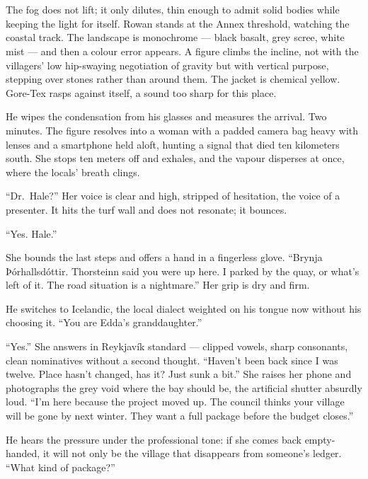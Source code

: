 \documentclass[11pt,oneside]{book}
\begin{document}
\chapter{}

The fog does not lift; it only dilutes, thin enough to admit solid
bodies while keeping the light for itself. Rowan stands at the Annex
threshold, watching the coastal track. The landscape is monochrome ---
black basalt, grey scree, white mist --- and then a colour error
appears. A figure climbs the incline, not with the villagers' low
hip-swaying negotiation of gravity but with vertical purpose, stepping
over stones rather than around them. The jacket is chemical yellow.
Gore-Tex rasps against itself, a sound too sharp for this place.

He wipes the condensation from his glasses and measures the arrival. Two
minutes. The figure resolves into a woman with a padded camera bag heavy
with lenses and a smartphone held aloft, hunting a signal that died ten
kilometers south. She stops ten meters off and exhales, and the vapour
disperses at once, where the locals' breath clings.

``Dr.~Hale?'' Her voice is clear and high, stripped of hesitation, the
voice of a presenter. It hits the turf wall and does not resonate; it
bounces.

``Yes. Hale.''

She bounds the last steps and offers a hand in a fingerless glove.
``Brynja Þórhallsdóttir. Thorsteinn said you were up here. I parked by
the quay, or what's left of it. The road situation is a nightmare.'' Her
grip is dry and firm.

He switches to Icelandic, the local dialect weighted on his tongue now
without his choosing it. ``You are Edda's granddaughter.''

``Yes.'' She answers in Reykjavík standard --- clipped vowels, sharp
consonants, clean nominatives without a second thought. ``Haven't been
back since I was twelve. Place hasn't changed, has it? Just sunk a
bit.'' She raises her phone and photographs the grey void where the bay
should be, the artificial shutter absurdly loud. ``I'm here because the
project moved up. The council thinks your village will be gone by next
winter. They want a full package before the budget closes.''

He hears the pressure under the professional tone: if she comes back
empty-handed, it will not only be the village that disappears from
someone's ledger. ``What kind of package?''
\end{document}
